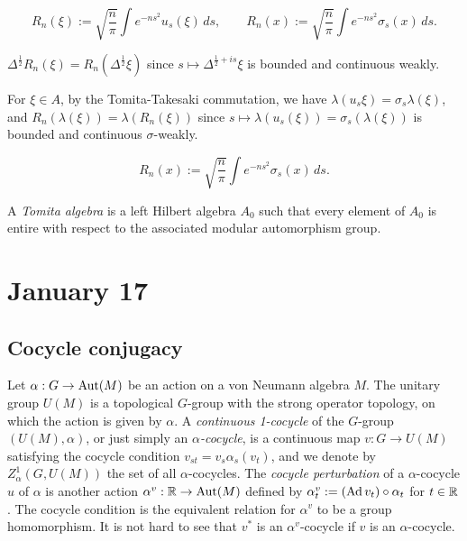 \documentclass{../../../small}
\begin{document}
\begin{ex}
\[R_n(\xi):=\sqrt{\frac n\pi}\int e^{-ns^2}u_s(\xi)\,ds,\qquad R_n(x):=\sqrt{\frac n\pi}\int e^{-ns^2}\sigma_s(x)\,ds.\]

$\Delta^{\frac12}R_n(\xi)=R_n(\Delta^{\frac12}\xi)$ since $s\mapsto\Delta^{\frac12+is}\xi$ is bounded and continuous weakly.

For $\xi\in A$, by the Tomita-Takesaki commutation, we have $\lambda(u_s\xi)=\sigma_s\lambda(\xi)$, and $R_n(\lambda(\xi))=\lambda(R_n(\xi))$ since $s\mapsto\lambda(u_s(\xi))=\sigma_s(\lambda(\xi))$ is bounded and continuous $\sigma$-weakly.


\[R_n(x):=\sqrt{\frac n\pi}\int e^{-ns^2}\sigma_s(x)\,ds.\]

A \emph{Tomita algebra} is a left Hilbert algebra $A_0$ such that every element of $A_0$ is entire with respect to the associated modular automorphism group.
\end{ex}








\newpage
\section{January 17}

\subsection{Cocycle conjugacy}



\begin{defn}
Let $\alpha:G\to\operatorname{Aut}(M)$ be an action on a von Neumann algebra $M$.
The unitary group $U(M)$ is a topological $G$-group with the strong operator topology, on which the action is given by $\alpha$.
A \emph{continuous 1-cocycle} of the $G$-group $(U(M),\alpha)$, or just simply an \emph{$\alpha$-cocycle}, is a continuous map $v:G\to U(M)$ satisfying the cocycle condition $v_{st}=v_s\alpha_s(v_t)$, and we denote by $Z_\alpha^1(G,U(M))$ the set of all $\alpha$-cocycles.
The \emph{cocycle perturbation} of a $\alpha$-cocycle $u$ of $\alpha$ is another action $\alpha^v:\mathbb{R}\to\operatorname{Aut}(M)$ defined by $\alpha_t^v:=(\operatorname{Ad} v_t)\circ\alpha_t$ for $t\in\mathbb{R}$.
The cocycle condition is the equivalent relation for $\alpha^v$ to be a group homomorphism.
It is not hard to see that $v^*$ is an $\alpha^v$-cocycle if $v$ is an $\alpha$-cocycle.
\end{defn}
\end{document}
